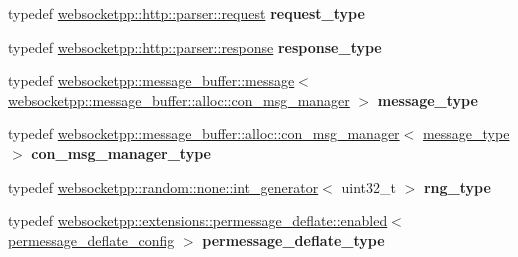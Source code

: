 \begin{DoxyCompactItemize}
\item 
\mbox{\label{structstub__config__ext_a7d918055368df24ac5abc2ec695f2337}} 
typedef \mbox{\hyperlink{classwebsocketpp_1_1http_1_1parser_1_1request}{websocketpp\+::http\+::parser\+::request}} {\bfseries request\+\_\+type}
\item 
\mbox{\label{structstub__config__ext_abfbba32dd761354bcc689014cd054a80}} 
typedef \mbox{\hyperlink{classwebsocketpp_1_1http_1_1parser_1_1response}{websocketpp\+::http\+::parser\+::response}} {\bfseries response\+\_\+type}
\item 
\mbox{\label{structstub__config__ext_a94688e37cfadde39cd35d28bc42204b6}} 
typedef \mbox{\hyperlink{classwebsocketpp_1_1message__buffer_1_1message}{websocketpp\+::message\+\_\+buffer\+::message}}$<$ \mbox{\hyperlink{classwebsocketpp_1_1message__buffer_1_1alloc_1_1con__msg__manager}{websocketpp\+::message\+\_\+buffer\+::alloc\+::con\+\_\+msg\+\_\+manager}} $>$ {\bfseries message\+\_\+type}
\item 
\mbox{\label{structstub__config__ext_a8dfac1ea38925de311f58a612c2da629}} 
typedef \mbox{\hyperlink{classwebsocketpp_1_1message__buffer_1_1alloc_1_1con__msg__manager}{websocketpp\+::message\+\_\+buffer\+::alloc\+::con\+\_\+msg\+\_\+manager}}$<$ \mbox{\hyperlink{classwebsocketpp_1_1message__buffer_1_1message}{message\+\_\+type}} $>$ {\bfseries con\+\_\+msg\+\_\+manager\+\_\+type}
\item 
\mbox{\label{structstub__config__ext_a73b73b9c92e656f0fa8a56b5fe4e43b4}} 
typedef \mbox{\hyperlink{classwebsocketpp_1_1random_1_1none_1_1int__generator}{websocketpp\+::random\+::none\+::int\+\_\+generator}}$<$ uint32\+\_\+t $>$ {\bfseries rng\+\_\+type}
\item 
\mbox{\label{structstub__config__ext_a4bcc26e234e47e0dced0db671313124e}} 
typedef \mbox{\hyperlink{classwebsocketpp_1_1extensions_1_1permessage__deflate_1_1enabled}{websocketpp\+::extensions\+::permessage\+\_\+deflate\+::enabled}}$<$ \mbox{\hyperlink{structstub__config__ext_1_1permessage__deflate__config}{permessage\+\_\+deflate\+\_\+config}} $>$ {\bfseries permessage\+\_\+deflate\+\_\+type}
\end{DoxyCompactItemize}
